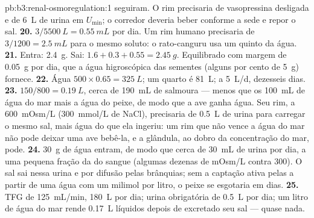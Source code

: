 \begin{solution}{pb:b3:renal-osmoregulation:1}
seguiram. O rim precisaria de vasopressina desligada e de \qty{6}{L} de
urina em $U_{\min}$; o corredor deveria beber conforme a sede e repor o
sal.
\textbf{20.} $3/5500\ \unit{L} = \qty{0.55}{mL}$ por dia. Um rim humano
precisaria de $3/1200 = \qty{2.5}{mL}$ para o mesmo soluto: o
rato-canguru usa um quinto da água.
\textbf{21.} Entra: \qty{2.4}{g}. Sai: $1.6 + 0.3 + 0.55 = \qty{2.45}{g}$. Equilibrado com margem de \qty{0.05}{g} por dia, que a
água higroscópica das sementes (alguns por cento de \qty{5}{g})
fornece.
\textbf{22.} Água $500\times 0.65 = \qty{325}{L}$; um quarto é
\qty{81}{L}; a \qty{5}{L/d}, dezesseis dias.
\textbf{23.} $150/800 = \qty{0.19}{L}$, cerca de \qty{190}{mL} de
salmoura --- menos que os \qty{100}{mL} de água do mar mais a água do
peixe, de modo que a ave ganha água. Seu rim, a \qty{600}{mOsm/L}
(\qty{300}{mmol/L} de NaCl), precisaria de \qty{0.5}{L} de urina para
carregar o mesmo sal, mais água do que ela ingeriu: um rim que não vence
a água do mar não pode deixar uma ave bebê-la, e a glândula, ao dobro da
concentração do mar, pode.
\textbf{24.} \qty{30}{g} de água entram, de modo que cerca de
\qty{30}{mL} de urina por dia, a uma pequena fração da  do
sangue (algumas dezenas de mOsm/L contra \num{300}). O sal sai nessa
urina e por difusão pelas brânquias; sem a captação ativa pelas  a partir de uma água com um milimol por litro, o peixe se
esgotaria em dias.
\textbf{25.} TFG de \qty{125}{mL/min}, \qty{180}{L} por dia; urina
obrigatória de \qty{0.5}{L} por dia; um litro de água do mar rende
\qty{0.17}{L} líquidos depois de excretado seu sal --- quase nada.
\end{solution}
